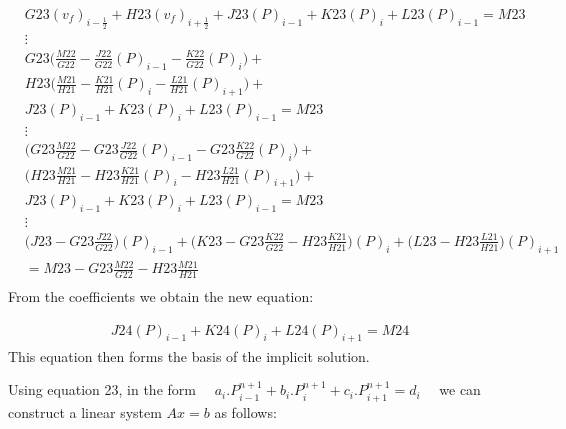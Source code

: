 \documentclass[11pt,letterpaper,titlepage]{article}
\newcommand{\half}{\frac{1}{2}}
\begin{document}
\begin{equation*}
\begin{aligned}
&G23(v_f)_{i-\half} + H23(v_f)_{i+\half} + J23(P)_{i-1} + K23(P)_{i} + L23(P)_{i-1}=M23\\
&\vdots\\
&G23\biggr( \frac{M22}{G22} - \frac{J22}{G22}(P)_{i-1} - \frac{K22}{G22}(P)_{i} \biggr) + \\
&H23\biggr( \frac{M21}{H21} - \frac{K21}{H21}(P)_{i} - \frac{L21}{H21}(P)_{i+1} \biggr) + \\
&J23(P)_{i-1} + K23(P)_{i} + L23(P)_{i-1}=M23\\
&\vdots\\
&\biggr( G23\frac{M22}{G22} - G23\frac{J22}{G22}(P)_{i-1} - G23\frac{K22}{G22}(P)_{i} \biggr) + \\
&\biggr( H23\frac{M21}{H21} - H23\frac{K21}{H21}(P)_{i} - H23\frac{L21}{H21}(P)_{i+1} \biggr) + \\
&J23(P)_{i-1} + K23(P)_{i} + L23(P)_{i-1}=M23\\
&\vdots\\
&\biggr( J23 - G23\frac{J22}{G22} \biggr)(P)_{i-1} + \biggr( K23 - G23\frac{K22}{G22} - H23\frac{K21}{H21} \biggr)(P)_{i} + \biggr( L23 - H23\frac{L21}{H21} \biggr)(P)_{i+1} \\
&=M23 -  G23\frac{M22}{G22} - H23\frac{M21}{H21}\\
\end{aligned}
\end{equation*}
\newline
\newline
\noindent
From the coefficients we obtain the new equation:

\begin{equation}
\begin{aligned}
 J24(P)_{i-1} + K24(P)_{i} + L24(P)_{i+1}=M24
\end{aligned}
\end{equation}
\newline
\newline
This equation then forms the basis of the implicit solution.

\newpage
\noindent                
Using equation 23, in the form $\quad a_i.P_{i-1}^{n+1} + b_i.P_{i}^{n+1} + c_i.P_{i+1}^{n+1} = d_i \quad $ we can construct a linear system $Ax=b$ as follows:
\end{document}
